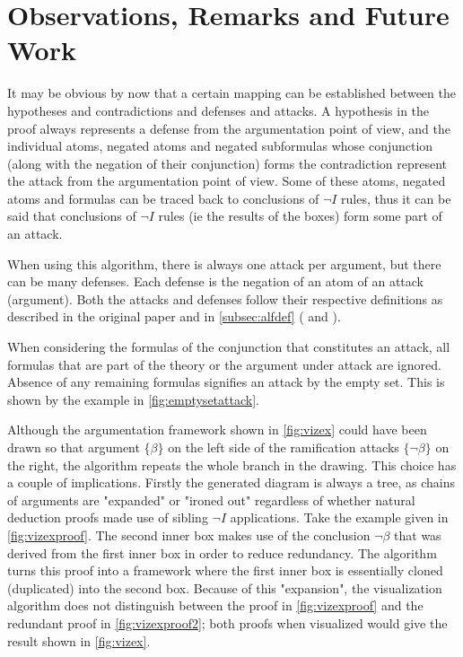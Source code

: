 \documentclass[11pt,twoside,a4paper]{report}
\begin{document}
\section{Observations, Remarks and Future Work}
It may be obvious by now that a certain mapping can be established between the hypotheses and contradictions and defenses and attacks. A hypothesis in the proof always represents a defense from the argumentation point of view, and the individual atoms, negated atoms and negated subformulas whose conjunction (along with the negation of their conjunction) forms the contradiction represent the attack from the argumentation point of view. Some of these atoms, negated atoms and formulas can be traced back to conclusions of $\neg I$ rules, thus it can be said that conclusions of $\neg I$ rules (ie the results of the boxes) form some part of an attack.

When using this algorithm, there is always one attack per argument, but there can be many defenses. Each defense is the negation of an atom of an attack (argument). Both the attacks and defenses follow their respective definitions as described in the original paper and in \autoref{subsec:alfdef} ( and ).

When considering the formulas of the conjunction that constitutes an attack, all formulas that are part of the theory or the argument under attack are ignored. Absence of any remaining formulas signifies an attack by the empty set. This is shown by the example in \autoref{fig:emptysetattack}.

Although the argumentation framework shown in \autoref{fig:vizex} could have been drawn so that argument $\{\beta\}$ on the left side of the ramification attacks $\{\neg\beta\}$ on the right, the algorithm repeats the whole branch in the drawing. This choice has a couple of implications. Firstly the generated diagram is always a tree, as chains of arguments are "expanded" or "ironed out" regardless of whether natural deduction proofs made use of sibling $\neg I$ applications. Take the example given in \autoref{fig:vizexproof}. The second inner box makes use of the conclusion $\neg\beta$ that was derived from the first inner box in order to reduce redundancy. The algorithm turns this proof into a framework where the first inner box is essentially cloned (duplicated) into the second box. Because of this "expansion", the visualization algorithm does not distinguish between the proof in \autoref{fig:vizexproof} and the redundant proof in \autoref{fig:vizexproof2}; both proofs when visualized would give the result shown in \autoref{fig:vizex}.
\end{document}
